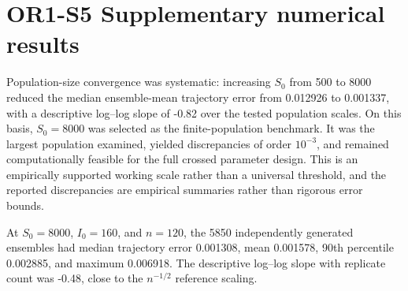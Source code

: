 \documentclass[11pt]{article}
\begin{document}
\section*{OR1-S5 Supplementary numerical results}
Population-size convergence was systematic: increasing $S_0$ from 500 to 8000 reduced the median ensemble-mean trajectory error from 0.012926 to 0.001337, with a descriptive log--log slope of -0.82 over the tested population scales. On this basis, $S_0=8000$ was selected as the finite-population benchmark. It was the largest population examined, yielded discrepancies of order $10^{-3}$, and remained computationally feasible for the full crossed parameter design. This is an empirically supported working scale rather than a universal threshold, and the reported discrepancies are empirical summaries rather than rigorous error bounds.

At $S_0=8000$, $I_0=160$, and $n=120$, the 5850 independently generated ensembles had median trajectory error 0.001308, mean 0.001578, 90th percentile 0.002885, and maximum 0.006918. The descriptive log--log slope with replicate count was -0.48, close to the $n^{-1/2}$ reference scaling.
\end{document}
